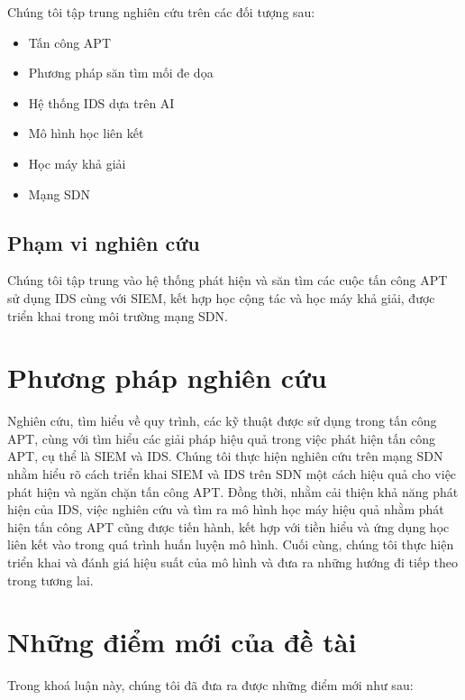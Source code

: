 Chúng tôi tập trung nghiên cứu trên các đối tượng sau:

\begin{itemize}
	\item Tấn công APT
        \item Phương pháp săn tìm mối đe dọa
        \item Hệ thống IDS dựa trên AI
	\item Mô hình học liên kết 
	\item Học máy khả giải
	\item Mạng SDN
\end{itemize}

\subsection{Phạm vi nghiên cứu}

Chúng tôi tập trung vào hệ thống phát hiện và săn tìm các cuộc tấn công APT sử dụng IDS cùng với SIEM, kết hợp học cộng tác và học máy khả giải, được triển khai trong môi trường mạng SDN.


\section{Phương pháp nghiên cứu}

Nghiên cứu, tìm hiểu về quy trình, các kỹ thuật được sử dụng trong tấn công APT, cùng với tìm hiểu các giải pháp hiệu quả trong việc phát hiện tấn công APT, cụ thể là SIEM và IDS. Chúng tôi thực hiện nghiên cứu trên mạng SDN nhằm hiểu rõ cách triển khai SIEM và IDS trên SDN một cách hiệu quả cho việc phát hiện và ngăn chặn tấn công APT. Đồng thời, nhằm cải thiện khả năng phát hiện của IDS, việc nghiên cứu và tìm ra mô hình học máy hiệu quả nhằm phát hiện tấn công APT cũng được tiến hành, kết hợp với tiền hiểu và ứng dụng học liên kết vào trong quá trình huấn luyện mô hình. Cuối cùng, chúng tôi thực hiện triển khai và đánh giá hiệu suất của mô hình và đưa ra những hướng đi tiếp theo trong tương lai.

\section{Những điểm mới của đề tài}

Trong khoá luận này, chúng tôi đã đưa ra được những điểm mới như sau:

